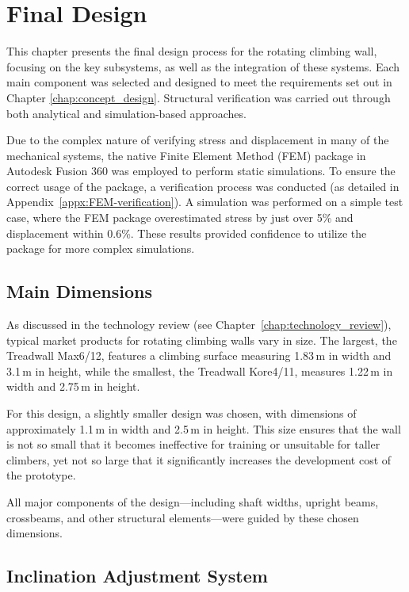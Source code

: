 \chapter{Final Design}
\label{chap:detailed_design}

This chapter presents the final design process for the rotating climbing wall, focusing on the key subsystems, as well as the integration of these systems. Each main component was selected and designed to meet the requirements set out in Chapter \ref{chap:concept_design}. Structural verification was carried out through both analytical and simulation-based approaches.

Due to the complex nature of verifying stress and displacement in many of the mechanical systems, the native Finite Element Method (FEM) package in Autodesk Fusion 360 was employed to perform static simulations. To ensure the correct usage of the package, a verification process was conducted (as detailed in Appendix~\ref{appx:FEM-verification}). A simulation was performed on a simple test case, where the FEM package overestimated stress by just over 5\% and displacement within 0.6\%. These results provided confidence to utilize the package for more complex simulations.

\section{Main Dimensions}

As discussed in the technology review (see Chapter~\ref{chap:technology_review}), typical market products for rotating climbing walls vary in size. The largest, the Treadwall Max6/12, features a climbing surface measuring 1.83\,m in width and 3.1\,m in height, while the smallest, the Treadwall Kore4/11, measures 1.22\,m in width and 2.75\,m in height.

For this design, a slightly smaller design was chosen, with dimensions of approximately 1.1\,m in width and 2.5\,m in height. This size ensures that the wall is not so small that it becomes ineffective for training or unsuitable for taller climbers, yet not so large that it significantly increases the development cost of the prototype.

All major components of the design—including shaft widths, upright beams, crossbeams, and other structural elements—were guided by these chosen dimensions.

\section{Inclination Adjustment System}

